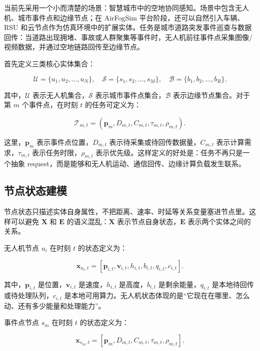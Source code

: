 ﻿\documentclass[UTF8,a4paper,11pt]{ctexart}
\begin{document}
当前先采用一个小而清楚的场景：智慧城市中的空地协同感知。场景中包含无人机、城市事件点和边缘节点；在 AirFogSim 平台阶段，还可以自然引入车辆、RSU 和云节点作为仿真环境中的扩展实体。任务是城市道路突发事件巡查与数据回传：当道路出现拥堵、事故或人群聚集等事件时，无人机前往事件点采集图像/视频数据，并通过空地链路回传至边缘节点。

首先定义三类核心实体集合：

\begin{equation}
\mathcal{U}=\{u_1,u_2,\ldots,u_N\},\quad
\mathcal{S}=\{s_1,s_2,\ldots,s_M\},\quad
\mathcal{B}=\{b_1,b_2,\ldots,b_R\}.
\end{equation}

其中，$\mathcal{U}$ 表示无人机集合，$\mathcal{S}$ 表示城市事件点集合，$\mathcal{B}$ 表示边缘节点集合。对于第 $m$ 个事件点，在时刻 $t$ 的任务可定义为：

\begin{equation}
\mathcal{T}_{m,t}=
\left(
\mathbf{p}_m,
D_{m,t},
C_{m,t},
\tau_{m,t},
\rho_{m,t}
\right).
\end{equation}

这里，$\mathbf{p}_m$ 表示事件点位置，$D_{m,t}$ 表示待采集或待回传数据量，$C_{m,t}$ 表示计算需求，$\tau_{m,t}$ 表示任务时限，$\rho_{m,t}$ 表示优先级。这样定义的好处是：任务不再只是一个抽象 request，而是能够和无人机运动、通信回传、边缘计算负载发生联系。

\subsection{节点状态建模}

节点状态只描述实体自身属性，不把距离、速率、时延等关系变量塞进节点里。这样可以避免 $\mathbf{X}$ 和 $\mathbf{E}$ 的语义混乱：$\mathbf{X}$ 表示节点自身状态，$\mathbf{E}$ 表示两个实体之间的关系。

无人机节点 $u_i$ 在时刻 $t$ 的状态定义为：

\begin{equation}
\mathbf{x}_{u_i,t}
=
\left[
\mathbf{p}_{i,t},
\mathbf{v}_{i,t},
h_{i,t},
b_{i,t},
q_{i,t},
c_{i,t}
\right].
\end{equation}

其中，$\mathbf{p}_{i,t}$ 是位置，$\mathbf{v}_{i,t}$ 是速度，$h_{i,t}$ 是高度，$b_{i,t}$ 是剩余能量，$q_{i,t}$ 是本地待回传或待处理队列，$c_{i,t}$ 是本地可用算力。无人机状态体现的是“它现在在哪里、怎么动、还有多少能量和处理能力”。

事件点节点 $s_m$ 在时刻 $t$ 的状态定义为：

\begin{equation}
\mathbf{x}_{s_m,t}
=
\left[
\mathbf{p}_m,
D_{m,t},
C_{m,t},
\tau_{m,t},
\rho_{m,t}
\right].
\end{equation}
\end{document}

